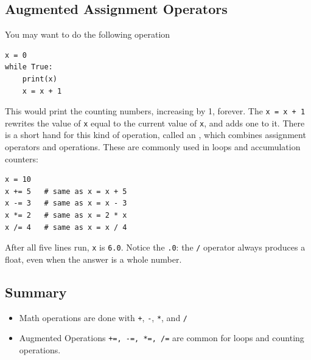 \subsection{Augmented Assignment Operators}
You may want to do the following operation
\begin{verbatim}
x = 0
while True:
    print(x)
    x = x + 1
\end{verbatim}
This would print the counting numbers, increasing by 1, forever. The \texttt{x = x + 1} rewrites the value of \texttt{x} equal to the current value of \texttt{x}, and adds one to it. There is a short hand for this kind of operation, called an , which combines assignment operators and operations. These are commonly used in loops and accumulation counters:
\begin{verbatim}
x = 10
x += 5   # same as x = x + 5
x -= 3   # same as x = x - 3
x *= 2   # same as x = 2 * x
x /= 4   # same as x = x / 4
\end{verbatim}
After all five lines run, \texttt{x} is \texttt{6.0}. Notice the \texttt{.0}: the \texttt{/} operator always produces a float, even when the answer is a whole number.

\subsection{Summary}
\begin{itemize}
    \item Math operations are done with \texttt{+}, \texttt{-}, \texttt{*}, and \texttt{/}
    \item Augmented Operations \texttt{+=, -=, *=, /=} are common for loops and counting operations. 
\end{itemize}

